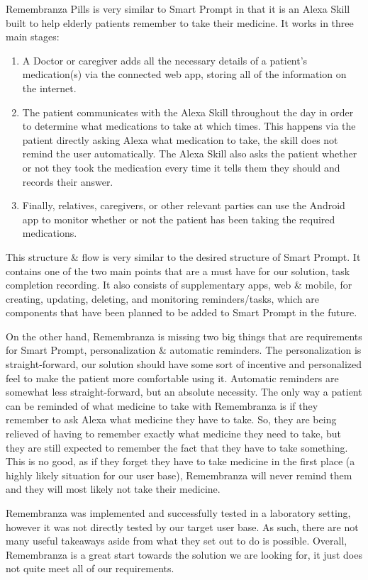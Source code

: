 \documentclass[11pt, oneside]{article}
\begin{document}
Remembranza Pills \cite{b2} is very similar to Smart Prompt in that it is an Alexa Skill built to help elderly patients remember to take their medicine. 
It works in three main stages: 
\begin{enumerate}
  \item A Doctor or caregiver adds all the necessary details of a patient's medication(s) via the connected web app, storing all of the information on the internet.
  \item The patient communicates with the Alexa Skill throughout the day in order to determine what medications to take at which times. This happens via the patient directly asking Alexa what medication to take, the skill does not remind the user automatically. The Alexa Skill also asks the patient whether or not they took the medication every time it tells them they should and records their answer.
  \item Finally, relatives, caregivers, or other relevant parties can use the Android app to monitor whether or not the patient has been taking the required medications. 
\end{enumerate}

This structure \& flow is very similar to the desired structure of Smart Prompt. 
It contains one of the two main points that are a must have for our solution, task completion recording. 
It also consists of supplementary apps, web \& mobile, for creating, updating, deleting, and monitoring reminders/tasks, which are components that have been planned to be added to Smart Prompt in the future. 

On the other hand, Remembranza is missing two big things that are requirements for Smart Prompt, personalization \& automatic reminders. 
The personalization is straight-forward, our solution should have some sort of incentive and personalized feel to make the patient more comfortable using it. 
Automatic reminders are somewhat less straight-forward, but an absolute necessity. 
The only way a patient can be reminded of what medicine to take with Remembranza is if they remember to ask Alexa what medicine they have to take. 
So, they are being relieved of having to remember exactly what medicine they need to take, but they are still expected to remember the fact that they have to take something. 
This is no good, as if they forget they have to take medicine in the first place (a highly likely situation for our user base), Remembranza will never remind them and they will most likely not take their medicine. 

Remembranza was implemented and successfully tested in a laboratory setting, however it was not directly tested by our target user base. 
As such, there are not many useful takeaways aside from what they set out to do is possible. 
Overall, Remembranza is a great start towards the solution we are looking for, it just does not quite meet all of our requirements. 
\end{document}
